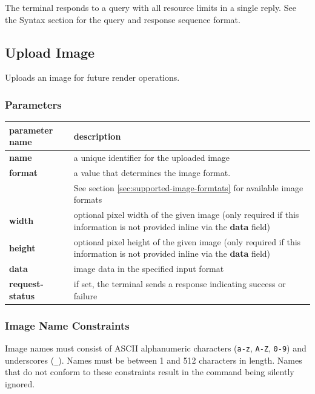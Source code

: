 \documentclass[a4paper]{article}
\newcommand{\code}[1]{\colorbox{light-gray}{\texttt{#1}}}
\begin{document}
The terminal responds to a query with all resource limits in a single reply.
See the Syntax section for the query and response sequence format.

\subsection{Upload Image} %

Uploads an image for future render operations.

\subsubsection*{Parameters}

\begin{tabular}{|m{3cm}|m{12cm}|}
  \hline
  \textbf{parameter name} & \textbf{description} \\
  \hline
  \textbf{name}           & a unique identifier for the uploaded image \\
  \textbf{format}         & a value that determines the image format. \\
                          & See section \ref{sec:supported-image-formtats} for available image formats \\
  \textbf{width}          & optional pixel width of the given image
                            (only required if this information is not provided
                            inline via the \textbf{data} field) \\
  \textbf{height}         & optional pixel height of the given image
                            (only required if this information is not provided
                            inline via the \textbf{data} field) \\
  \textbf{data}           & image data in the specified input format \\
  \textbf{request-status} & if set, the terminal sends a response indicating success or failure \\
  \hline
\end{tabular}

\subsubsection{Image Name Constraints}

Image names must consist of ASCII alphanumeric characters (\code{a-z}, \code{A-Z}, \code{0-9})
and underscores (\code{\_}). Names must be between 1 and 512 characters in length.
Names that do not conform to these constraints result in the command being silently ignored.
\end{document}
